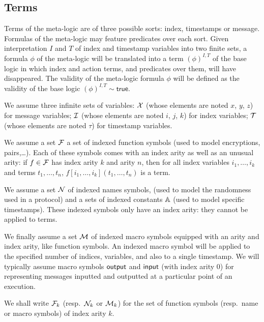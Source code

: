 \subsection{Terms}

Terms of the meta-logic are of three possible sorts: index, timestamps
or message. Formulas of the meta-logic may feature predicates over each sort.
Given interpretation $I$ and $T$ of index and timestamp variables
into two finite sets, a formula $\phi$ of the meta-logic will be translated 
into a term $(\phi)^{I,T}$ of the base logic in which index and action terms, 
and predicates over them, will have disappeared. The validity of the 
meta-logic formula $\phi$ will be defined as the validity of the base logic
$(\phi)^{I,T}\sim\mathsf{true}$.

\medskip

We assume three infinite sets of variables:
$\mathcal{X}$ (whose elements are noted $x$, $y$, $z$) for message variables;
$\mathcal{I}$ (whose elements are noted $i$, $j$, $k$) for index variables;
$\mathcal{T}$ (whose elements are noted $\tau$) for timestamp variables.

We assume a set $\mathcal{F}$ a set of indexed function symbols
(used to model encryptions, pairs,\dots).
Each of these symbols comes with an index arity as well as an unusual arity:
if $f\in\mathcal{F}$ has index arity $k$ and arity $n$,
then for all index variables $i_1,\ldots,i_k$ and terms $t_1,\ldots,t_n$,
$f[i_1,\ldots,i_k](t_1,\ldots,t_n)$ is a term.

We assume a set $\mathcal{N}$ of indexed names symbols,
(used to model the randomness used in a protocol)
and a sets of indexed constants $\mathbb{A}$
(used to model specific timestamps).
These indexed symbols only have an index arity: they
cannot be applied to terms.

We finally assume a set $\mathcal{M}$ of indexed macro symbols
equipped with an arity and index arity, like function symbols.
An indexed macro symbol will be applied to the specified number of
indices, variables, and also to a single timestamp.
We will typically assume macro symbols $\textsf{output}$ and $\textsf{input}$
(with index arity $0$) for representing messages inputted and outputted
at a particular point of an execution.

We shall write $\mathcal{F}_k$ (resp.\ $\mathcal{N}_k$ or $\mathcal{M}_k$) for the set of function
symbols (resp.\ name or macro symbols) of index arity $k$.

